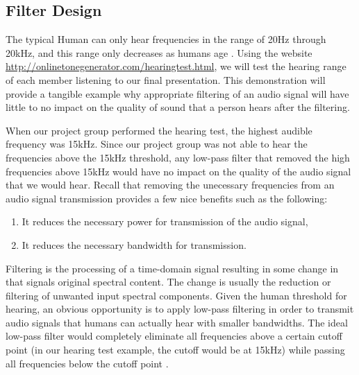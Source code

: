 \subsection{Filter Design}

The typical Human can only hear frequencies in the range of 20Hz
through 20kHz, and this range only decreases as humans age
\cite{human:rg}. Using the website
\url{http://onlinetonegenerator.com/hearingtest.html}, we will
test the hearing range of each member listening to our final
presentation. This demonstration will provide a tangible example
why appropriate filtering of an audio signal will have little to
no impact on the quality of sound that a person hears after the  
filtering.

When our project group performed the hearing test, the highest
audible frequency was 15kHz. Since our project group was not able
to hear the frequencies above the 15kHz threshold, any low-pass
filter that removed the high frequencies above 15kHz would have
no impact on the quality of the audio signal that we would hear.
Recall that removing the unecessary frequencies from an audio signal
transmission provides a few nice benefits such as the following:

\begin{enumerate}
\item It reduces the necessary power for transmission of the audio signal,
\item It reduces the necessary bandwidth for transmission.
\end{enumerate}

Filtering is the processing of a time-domain signal resulting in
some change in that signals original spectral content. The change
is usually the reduction or filtering of unwanted input spectral
components\cite{lyons:intro}. Given the human threshold for
hearing, an obvious opportunity is to apply low-pass filtering in
order to transmit audio signals that humans can actually hear
with smaller bandwidths. The ideal low-pass filter would
completely eliminate all frequencies above a certain cutoff point
(in our hearing test example, the cutoff would be at 15kHz) while
passing all frequencies below the cutoff point  
\cite{lowpass:wiki}.


